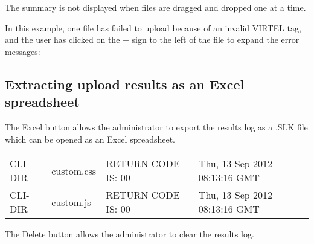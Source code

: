 \documentclass[letterpaper,10pt,english]{sphinxmanual}
\begin{document}
The summary is not displayed when files are dragged and dropped one at a time.

In this example, one file has failed to upload because of an invalid VIRTEL tag, and the user has clicked on the + sign to the left of the file to expand the error messages:




\subsection{Extracting upload results as an Excel spreadsheet}
\label{\detokenize{audit_operations_ and_performance:extracting-upload-results-as-an-excel-spreadsheet}}\label{\detokenize{audit_operations_ and_performance:index-60}}
 The Excel button allows the administrator to export the results log as a .SLK file which can be opened as an Excel spreadsheet.


\begin{savenotes}\sphinxattablestart
\centering
\begin{tabulary}{\linewidth}[t]{|T|T|T|T|}
\hline
{}\relax &\relax &\relax &\relax \\
\hline
CLI-DIR
&
custom.css
&
RETURN CODE IS: 00
&
Thu, 13 Sep 2012 08:13:16 GMT
\\
\hline
CLI-DIR
&
custom.js
&
RETURN CODE IS: 00
&
Thu, 13 Sep 2012 08:13:16 GMT
\\
\hline
\end{tabulary}
\par
\sphinxattableend\end{savenotes}

 The Delete button allows the administrator to clear the results log.
\begin{quote}

\end{quote}
\end{document}
